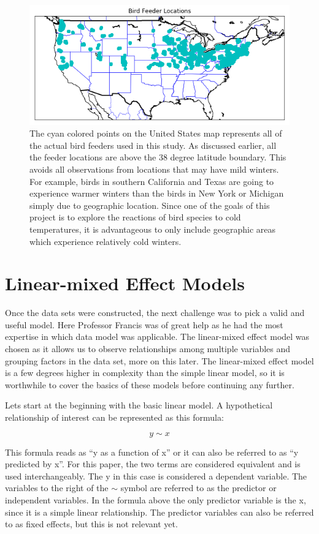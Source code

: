 \begin{figure}[h]
\centering
\includegraphics[width=1.0\textwidth]{figures/bf_locations_USmap.png}
\caption{The cyan colored points on the United States map represents all of the actual bird feeders used in this study. As discussed earlier, all the feeder locations are above the 38 degree latitude boundary. This avoids all observations from locations that may have mild winters. For example, birds in southern California and Texas are going to experience warmer winters than the birds in New York or Michigan simply due to geographic location. Since one of the goals of this project is to explore the reactions of bird species to cold temperatures, it is advantageous to only include geographic areas which experience relatively cold winters.}
\end{figure}

\section{Linear-mixed Effect Models}

Once the data sets were constructed, the next challenge was to pick a valid and useful model. Here Professor Francis was of great help as he had the most expertise in which data model was applicable. The linear-mixed effect model was chosen as it allows us to observe relationships among multiple variables and grouping factors in the data set, more on this later. The linear-mixed effect model is a few degrees higher in complexity than the simple linear model, so it is worthwhile to cover the basics of these models before continuing any further.     
 
Lets start at the beginning with the basic linear model. A hypothetical relationship of interest can be represented as this formula:

\[ y \sim x \]

This formula reads as ``y as a function of x'' or it can also be referred to as ``y predicted by x''. For this paper, the two terms are considered equivalent and is used interchangeably. The y in this case is considered a dependent variable. The variables to the right of the $\sim$ symbol are referred to as the predictor or independent variables. In the formula above the only predictor variable is the x, since it is a simple linear relationship. The predictor variables can also be referred to as fixed effects, but this is not relevant yet.

